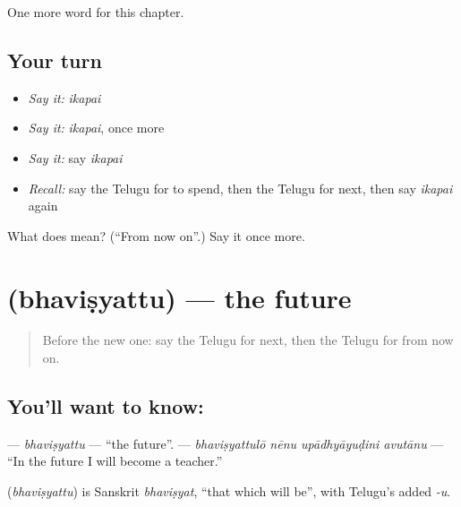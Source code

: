\begin{grammarlens}[title={What you've built}]
One more word for this chapter.
\end{grammarlens}

\subsection*{Your turn}
\begin{itemize}
\raggedright
  \item \emph{Say it:} \emph{ikapai}
  \item \emph{Say it:} \emph{ikapai}, once more
  \item \emph{Say it:} say \emph{ikapai}
  \item \emph{Recall:} say the Telugu for to spend, then the Telugu for next, then say \emph{ikapai} again
\end{itemize}

\begin{tcolorbox}[breakable,colback=teal!4,colframe=teal!35!black,title={Before you move on}]
What does  mean? (\textquotedblleft{}From now on\textquotedblright{}.) Say it once more.
\end{tcolorbox}
\section[\texorpdfstring{\te{భవిష్యత్తు} (bhaviṣyattu)}{భవిష్యత్తు (bhaviṣyattu)}]{ (bhaviṣyattu) — the future}

\label{lesson:TE-C155-bhavishyattu}



\begin{quote}
Before the new one: say the Telugu for next, then the Telugu for from now on.
\end{quote}

\subsection*{You'll want to know: }
\textbf{} — \emph{bhaviṣyattu} — \textquotedblleft{}the future\textquotedblright{}. \textbf{   } — \emph{bhaviṣyattulō nēnu upādhyāyuḍini avutānu} — \textquotedblleft{}In the future I will become a teacher.\textquotedblright{}

\begin{cousinweb}
\textbf{} (\emph{bhaviṣyattu}) is Sanskrit \emph{bhaviṣyat}, \textquotedblleft{}that which will be\textquotedblright{}, with Telugu's added \emph{-u}.
\end{cousinweb}

